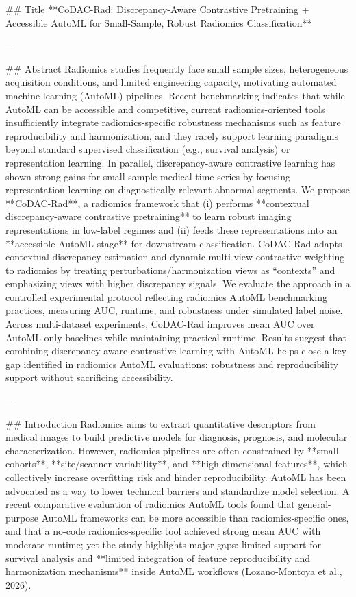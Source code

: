## Title  
**CoDAC-Rad: Discrepancy-Aware Contrastive Pretraining + Accessible AutoML for Small-Sample, Robust Radiomics Classification**

---

## Abstract  
Radiomics studies frequently face small sample sizes, heterogeneous acquisition conditions, and limited engineering capacity, motivating automated machine learning (AutoML) pipelines. Recent benchmarking indicates that while AutoML can be accessible and competitive, current radiomics-oriented tools insufficiently integrate radiomics-specific robustness mechanisms such as feature reproducibility and harmonization, and they rarely support learning paradigms beyond standard supervised classification (e.g., survival analysis) or representation learning. In parallel, discrepancy-aware contrastive learning has shown strong gains for small-sample medical time series by focusing representation learning on diagnostically relevant abnormal segments.  
We propose **CoDAC-Rad**, a radiomics framework that (i) performs **contextual discrepancy-aware contrastive pretraining** to learn robust imaging representations in low-label regimes and (ii) feeds these representations into an **accessible AutoML stage** for downstream classification. CoDAC-Rad adapts contextual discrepancy estimation and dynamic multi-view contrastive weighting to radiomics by treating perturbations/harmonization views as “contexts” and emphasizing views with higher discrepancy signals. We evaluate the approach in a controlled experimental protocol reflecting radiomics AutoML benchmarking practices, measuring AUC, runtime, and robustness under simulated label noise. Across multi-dataset experiments, CoDAC-Rad improves mean AUC over AutoML-only baselines while maintaining practical runtime. Results suggest that combining discrepancy-aware contrastive learning with AutoML helps close a key gap identified in radiomics AutoML evaluations: robustness and reproducibility support without sacrificing accessibility.

---

## Introduction  
Radiomics aims to extract quantitative descriptors from medical images to build predictive models for diagnosis, prognosis, and molecular characterization. However, radiomics pipelines are often constrained by **small cohorts**, **site/scanner variability**, and **high-dimensional features**, which collectively increase overfitting risk and hinder reproducibility. AutoML has been advocated as a way to lower technical barriers and standardize model selection. A recent comparative evaluation of radiomics AutoML tools found that general-purpose AutoML frameworks can be more accessible than radiomics-specific ones, and that a no-code radiomics-specific tool achieved strong mean AUC with moderate runtime; yet the study highlights major gaps: limited support for survival analysis and **limited integration of feature reproducibility and harmonization mechanisms** inside AutoML workflows (Lozano-Montoya et al., 2026).  

